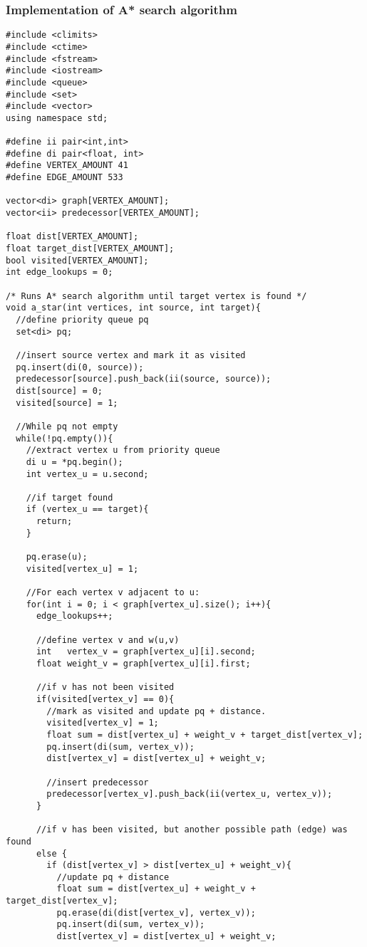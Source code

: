 \documentclass[11pt]{article}
\begin{document}
\subsubsection{Implementation of A* search algorithm}
\begin{lstlisting}
#include <climits>
#include <ctime>
#include <fstream>
#include <iostream>
#include <queue>
#include <set>
#include <vector>
using namespace std;

#define ii pair<int,int>
#define di pair<float, int>
#define VERTEX_AMOUNT 41
#define EDGE_AMOUNT 533 

vector<di> graph[VERTEX_AMOUNT];
vector<ii> predecessor[VERTEX_AMOUNT];

float dist[VERTEX_AMOUNT];
float target_dist[VERTEX_AMOUNT];
bool visited[VERTEX_AMOUNT];
int edge_lookups = 0;

/* Runs A* search algorithm until target vertex is found */
void a_star(int vertices, int source, int target){
  //define priority queue pq
  set<di> pq;
  
  //insert source vertex and mark it as visited
  pq.insert(di(0, source));
  predecessor[source].push_back(ii(source, source));
  dist[source] = 0;
  visited[source] = 1;

  //While pq not empty
  while(!pq.empty()){
    //extract vertex u from priority queue
    di u = *pq.begin();	
    int vertex_u = u.second;
		
    //if target found
    if (vertex_u == target){
      return;
    }

    pq.erase(u);
    visited[vertex_u] = 1;

    //For each vertex v adjacent to u:
    for(int i = 0; i < graph[vertex_u].size(); i++){
      edge_lookups++;
      
      //define vertex v and w(u,v)
      int   vertex_v = graph[vertex_u][i].second;
      float weight_v = graph[vertex_u][i].first;

      //if v has not been visited
      if(visited[vertex_v] == 0){
        //mark as visited and update pq + distance.
        visited[vertex_v] = 1;
        float sum = dist[vertex_u] + weight_v + target_dist[vertex_v];
        pq.insert(di(sum, vertex_v));
        dist[vertex_v] = dist[vertex_u] + weight_v;

        //insert predecessor
        predecessor[vertex_v].push_back(ii(vertex_u, vertex_v));
      }

      //if v has been visited, but another possible path (edge) was found
      else {
        if (dist[vertex_v] > dist[vertex_u] + weight_v){
          //update pq + distance
          float sum = dist[vertex_u] + weight_v + target_dist[vertex_v];
          pq.erase(di(dist[vertex_v], vertex_v));
          pq.insert(di(sum, vertex_v));
          dist[vertex_v] = dist[vertex_u] + weight_v;
				

\end{lstlisting}
\end{document}
